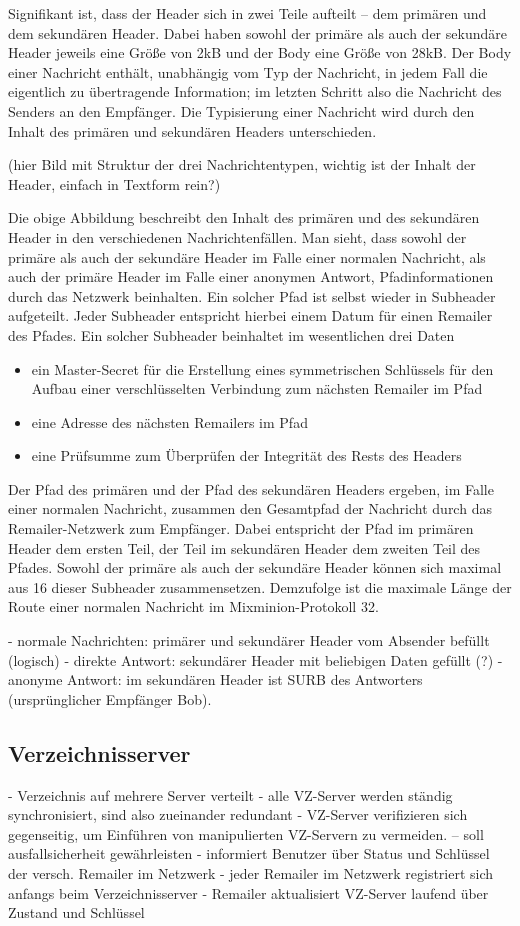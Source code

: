 Signifikant ist, dass der Header sich in zwei Teile aufteilt -- dem primären und dem sekundären Header. Dabei haben sowohl der primäre als auch der sekundäre Header jeweils eine Größe von 2kB und der Body eine Größe von 28kB. Der Body einer Nachricht enthält, unabhängig vom Typ der Nachricht, in jedem Fall die eigentlich zu übertragende Information; im letzten Schritt also die Nachricht des Senders an den Empfänger. Die Typisierung einer Nachricht wird durch den Inhalt des primären und sekundären Headers unterschieden.

(hier Bild mit Struktur der drei Nachrichtentypen, wichtig ist der Inhalt der Header, einfach in Textform rein?)

Die obige Abbildung beschreibt den Inhalt des primären und des sekundären Header in den verschiedenen Nachrichtenfällen.
Man sieht, dass sowohl der primäre als auch der sekundäre Header im Falle einer normalen Nachricht, als auch der primäre Header im Falle einer anonymen Antwort, Pfadinformationen durch das Netzwerk beinhalten.
Ein solcher Pfad ist selbst wieder in Subheader aufgeteilt. Jeder Subheader entspricht hierbei einem Datum für einen Remailer des Pfades. Ein solcher Subheader beinhaltet im wesentlichen drei Daten
\begin{itemize}
\item ein Master-Secret für die Erstellung eines symmetrischen Schlüssels für den Aufbau einer verschlüsselten Verbindung zum nächsten Remailer im Pfad
\item eine Adresse des nächsten Remailers im Pfad
\item eine Prüfsumme zum Überprüfen der Integrität des Rests des Headers
\end{itemize}
Der Pfad des primären und der Pfad des sekundären Headers ergeben, im Falle einer normalen Nachricht, zusammen den Gesamtpfad der Nachricht durch das Remailer-Netzwerk zum Empfänger. Dabei entspricht der Pfad im primären Header dem ersten Teil, der Teil im sekundären Header dem zweiten Teil des Pfades.
Sowohl der primäre als auch der sekundäre Header können sich maximal aus 16 dieser Subheader zusammensetzen. Demzufolge ist die maximale Länge der Route einer normalen Nachricht im Mixminion-Protokoll 32.

- normale Nachrichten: primärer und sekundärer Header vom Absender befüllt (logisch)
- direkte Antwort: sekundärer Header mit beliebigen Daten gefüllt (?)
- anonyme Antwort: im sekundären Header ist SURB des Antworters (ursprünglicher Empfänger Bob).

\subsection{Verzeichnisserver}
- Verzeichnis auf mehrere Server verteilt
- alle VZ-Server werden ständig synchronisiert, sind also zueinander redundant
- VZ-Server verifizieren sich gegenseitig, um Einführen von manipulierten VZ-Servern zu vermeiden.
-- soll ausfallsicherheit gewährleisten
- informiert Benutzer über Status und Schlüssel der versch. Remailer im Netzwerk
- jeder Remailer im Netzwerk registriert sich anfangs beim Verzeichnisserver
- Remailer aktualisiert VZ-Server laufend über Zustand und Schlüssel

